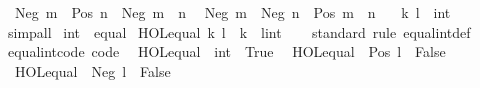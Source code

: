 \begin{isabellebody}
\ \ {\isachardoublequoteopen}Neg\ m\ {\isacharasterisk}{\kern0pt}\ Pos\ n\ {\isacharequal}{\kern0pt}\ Neg\ {\isacharparenleft}{\kern0pt}m\ {\isacharasterisk}{\kern0pt}\ n{\isacharparenright}{\kern0pt}{\isachardoublequoteclose}\isanewline
\ \ {\isachardoublequoteopen}Neg\ m\ {\isacharasterisk}{\kern0pt}\ Neg\ n\ {\isacharequal}{\kern0pt}\ Pos\ {\isacharparenleft}{\kern0pt}m\ {\isacharasterisk}{\kern0pt}\ n{\isacharparenright}{\kern0pt}{\isachardoublequoteclose}\isanewline
\ \ \ k\ l\ {\isacharcolon}{\kern0pt}{\isacharcolon}{\kern0pt}\ int\isanewline
%
\isadelimproof
\ \ %
\endisadelimproof
%
\isatagproof
{}\isamarkupfalse%
\ simp{\isacharunderscore}{\kern0pt}all%
\endisatagproof
{\isafoldproof}%
%
\isadelimproof
\isanewline
%
\endisadelimproof
\isanewline
{}\isamarkupfalse%
\ int\ {\isacharcolon}{\kern0pt}{\isacharcolon}{\kern0pt}\ equal\isanewline
{}\isanewline
\isanewline
{}\isamarkupfalse%
\ {\isachardoublequoteopen}HOL{\isachardot}{\kern0pt}equal\ k\ l\ {\isasymlongleftrightarrow}\ k\ {\isacharequal}{\kern0pt}\ {\isacharparenleft}{\kern0pt}l{\isacharcolon}{\kern0pt}{\isacharcolon}{\kern0pt}int{\isacharparenright}{\kern0pt}{\isachardoublequoteclose}\isanewline
\isanewline
{}\isamarkupfalse%
\isanewline
%
\isadelimproof
\ \ %
\endisadelimproof
%
\isatagproof
{}\isamarkupfalse%
\ standard\ {\isacharparenleft}{\kern0pt}rule\ equal{\isacharunderscore}{\kern0pt}int{\isacharunderscore}{\kern0pt}def{\isacharparenright}{\kern0pt}%
\endisatagproof
{\isafoldproof}%
%
\isadelimproof
\isanewline
%
\endisadelimproof
\isanewline
{}\isamarkupfalse%
\isanewline
\isanewline
{}\isamarkupfalse%
\ equal{\isacharunderscore}{\kern0pt}int{\isacharunderscore}{\kern0pt}code\ {\isacharbrackleft}{\kern0pt}code{\isacharbrackright}{\kern0pt}{\isacharcolon}{\kern0pt}\isanewline
\ \ {\isachardoublequoteopen}HOL{\isachardot}{\kern0pt}equal\ {}\ {\isacharparenleft}{\kern0pt}{}{\isacharcolon}{\kern0pt}{\isacharcolon}{\kern0pt}int{\isacharparenright}{\kern0pt}\ {\isasymlongleftrightarrow}\ True{\isachardoublequoteclose}\isanewline
\ \ {\isachardoublequoteopen}HOL{\isachardot}{\kern0pt}equal\ {}\ {\isacharparenleft}{\kern0pt}Pos\ l{\isacharparenright}{\kern0pt}\ {\isasymlongleftrightarrow}\ False{\isachardoublequoteclose}\isanewline
\ \ {\isachardoublequoteopen}HOL{\isachardot}{\kern0pt}equal\ {}\ {\isacharparenleft}{\kern0pt}Neg\ l{\isacharparenright}{\kern0pt}\ {\isasymlongleftrightarrow}\ False{\isachardoublequoteclose}\isanewline

\end{isabellebody}
